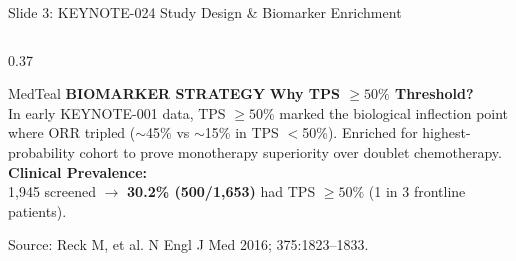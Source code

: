 \documentclass[aspectratio=169,10pt]{beamer}
\begin{document}
\begin{frame}{Slide 3: KEYNOTE-024 Study Design \& Biomarker Enrichment}
\begin{columns}[T]
  \begin{column}{0.37\textwidth}
    \begin{statcard}{MedTeal}
      {\footnotesize\textbf{\color{MedTeal}BIOMARKER STRATEGY}}
      \vskip 2pt
      \scriptsize
      \textbf{Why TPS $\ge 50\%$ Threshold?}\\
      In early KEYNOTE-001 data, TPS $\ge 50\%$ marked the biological inflection point where ORR tripled ($\sim$45\% vs $\sim$15\% in TPS $<$50\%). Enriched for highest-probability cohort to prove monotherapy superiority over doublet chemotherapy.
      \vskip 4pt
      \textbf{Clinical Prevalence:}\\
      1,945 screened $\rightarrow$ \textbf{30.2\% (500/1,653)} had TPS $\ge 50\%$ (1 in 3 frontline patients).
    \end{statcard}
    \vskip 3pt
    {\raggedleft\tiny\color{TextMuted}Source: Reck M, et al. N Engl J Med 2016; 375:1823--1833.\par}
  \end{column}
\end{columns}
\end{frame}
\end{document}
